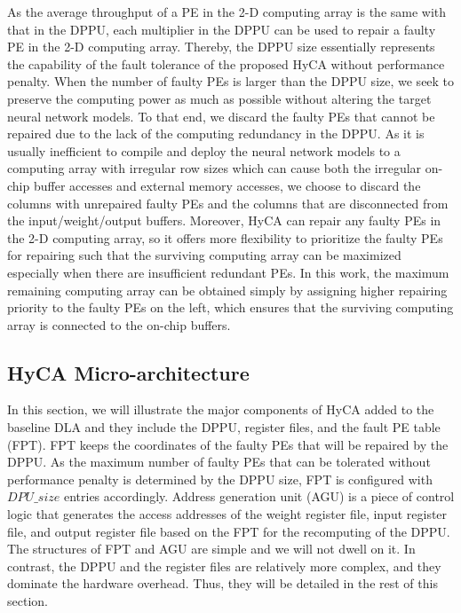 As the average throughput of a PE in the 2-D computing array is the same with that in the DPPU, each multiplier in the DPPU can be used to repair a faulty PE in the 2-D computing array. Thereby, the DPPU size essentially represents the capability of the fault tolerance of the proposed HyCA without performance penalty. When the number of faulty PEs is larger than the DPPU size, we seek to preserve the computing power as much as possible without altering the target neural network models. To that end, we discard the faulty PEs that cannot be repaired due to the lack of the computing redundancy in the DPPU. As it is usually inefficient to compile and deploy the neural network models to a computing array with irregular row sizes which can cause both the irregular on-chip buffer accesses and external memory accesses, we choose to discard the columns with unrepaired faulty PEs and the columns that are disconnected from the input/weight/output buffers. Moreover, HyCA can repair any faulty PEs in the 2-D computing array, so it offers more flexibility to prioritize the faulty PEs for repairing such that the surviving computing array can be maximized especially when there are insufficient redundant PEs. In this work, the maximum remaining computing array can be obtained simply by assigning higher repairing priority to the faulty PEs on the left, which ensures that the surviving computing array is connected to the on-chip buffers. 

\subsection{HyCA Micro-architecture}
In this section, we will illustrate the major components of HyCA added to the baseline DLA and they include the DPPU, register files, and the fault PE table (FPT). FPT keeps the coordinates of the faulty PEs that will be repaired by the DPPU. As the maximum number of faulty PEs that can be tolerated without performance penalty is determined by the DPPU size, FPT is configured with $DPU\_size$ entries accordingly. Address generation unit (AGU) is a piece of control logic that generates the access addresses of the weight register file, input register file, and output register file based on the FPT for the recomputing of the DPPU. The structures of FPT and AGU are simple and we will not dwell on it. In contrast, the DPPU and the register files are relatively more complex, and they dominate the hardware overhead. Thus, they will be detailed in the rest of this section.

